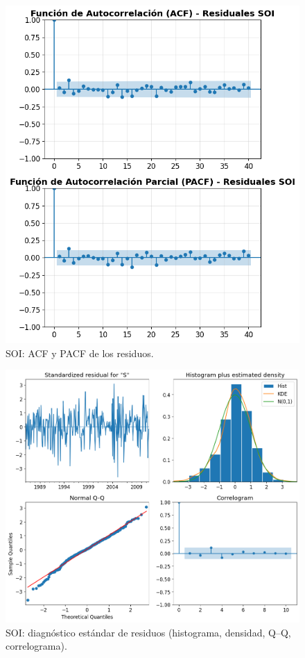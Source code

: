 \begin{figure}[H]\centering
\includegraphics[scale=.52]{Figures/acp_pacf_res_soi.png}
\caption{SOI: ACF y PACF de los residuos.}
\label{fig:acf_pacf_res_soi}
\end{figure}

\begin{figure}[H]\centering
\includegraphics[scale=.52]{Figures/res_std_soi.png}
\caption{SOI: diagnóstico estándar de residuos (histograma, densidad, Q--Q, correlograma).}
\label{fig:std_soi}
\end{figure}

